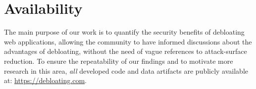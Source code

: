\section{Availability}

The main purpose of our work is to quantify the security benefits of
debloating web applications, allowing the community to have informed
discussions about the advantages of debloating, without the need of vague
references to attack-surface reduction. To ensure the repeatability of our findings and to motivate more research
in this area, \emph{all} developed code and data artifacts are publicly available at: \url{https://debloating.com}.







